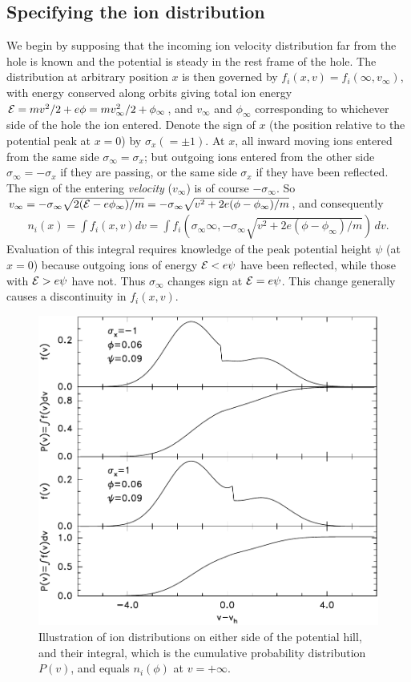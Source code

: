 \documentclass[12pt]{article}
\def\energy{{\cal E}}
\begin{document}
\subsection{Specifying the ion distribution}
We begin by supposing that the incoming ion velocity distribution far
from the hole is known and the potential is
steady in the rest frame of the hole.  The distribution at arbitrary
position $x$ is then governed by
$f_i(x,v)=f_{i}(\infty,v_\infty)$, with energy conserved along orbits
giving total ion energy $\energy=mv^2/2+e\phi=mv_{\infty}^2/2+\phi_\infty$, and
$v_{\infty}$ and $\phi_\infty$ corresponding to whichever side of the
hole the ion entered.  Denote the sign of $x$ (the position relative
to the potential peak at $x=0$) by
$\sigma_x(=\pm1)$. At $x$, all inward moving ions entered from the
same side $\sigma_{\infty}=\sigma_x$; but outgoing ions entered from
the other side $\sigma_\infty=-\sigma_x$ if they are passing, or the
same side $\sigma_x$ if they have been reflected. The sign of the
entering \emph{velocity} ($v_\infty$) is of course $-\sigma_\infty$.
So
$v_\infty=-\sigma_\infty\sqrt{2(\energy-e\phi_\infty)/m}=-\sigma_\infty\sqrt{v^2+2e(\phi-\phi_\infty)/m}$,
and consequently
\begin{equation}\label{ni}
  \begin{split}
  n_i(x)=\int f_i(x,v) dv=\int
  f_{i}(\sigma_\infty\infty,-\sigma_\infty\sqrt{v^2+2e(\phi-\phi_\infty)/m})\,dv.
    \end{split}
\end{equation}
Evaluation of this integral requires knowledge of the peak potential
height $\psi$ (at $x=0$) because outgoing ions of energy
$\energy<e\psi$ have been reflected, while those with $\energy>e\psi$ have
not. Thus $\sigma_\infty$ changes sign at $\energy=e\psi$. This change
generally causes a discontinuity in
$f_{i}(x,v)$.
\begin{figure}[htp]
  \centering
  \includegraphics[width=.6\hsize]{fiplots}
  \caption{Illustration of ion distributions on either side of the
    potential hill, and their integral, which is the cumulative
    probability distribution $P(v)$, and equals $n_i(\phi)$ at $v=+\infty$.}
  \label{fig:fiplots}
\end{figure}
\end{document}
